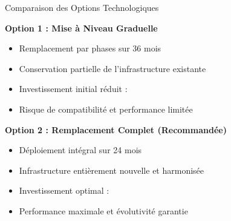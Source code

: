 \documentclass{dollarama}
\begin{document}


\begin{dollaramacomparison}{Comparaison des Options Technologiques}

\textbf{Option 1 : Mise à Niveau Graduelle}
\begin{itemize}
    \item Remplacement par phases sur 36 mois
    \item Conservation partielle de l'infrastructure existante
    \item Investissement initial réduit : 
    \item Risque de compatibilité et performance limitée
\end{itemize}

\vscompare

\textbf{Option 2 : Remplacement Complet (Recommandée)}
\begin{itemize}
    \item Déploiement intégral sur 24 mois
    \item Infrastructure entièrement nouvelle et harmonisée
    \item Investissement optimal : 
    \item Performance maximale et évolutivité garantie
\end{itemize}

\end{dollaramacomparison}

\vspace{1cm}
\end{document}
